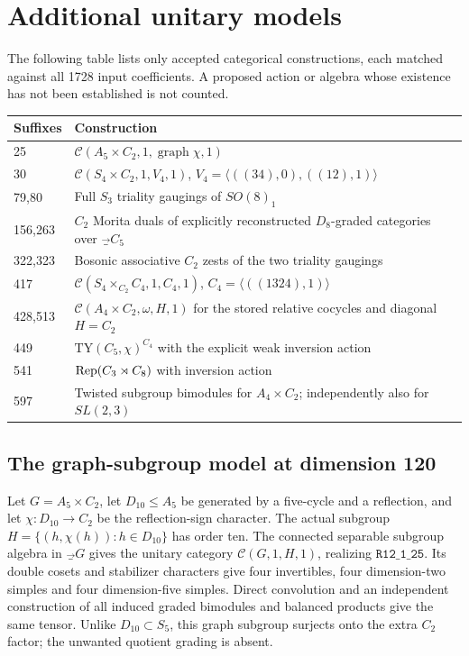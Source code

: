 \documentclass[11pt]{article}
\newcommand{\ring}[1]{\texttt{R12\_1\_#1}}
\begin{document}
\section{Additional unitary models}
The following table lists only accepted categorical constructions, each matched
against all 1728 input coefficients. A proposed action or algebra whose existence
has not been established is not counted.
\begin{center}\small\begin{longtable}{@{}lp{119mm}@{}}\toprule Suffixes&Construction\\\midrule\endhead
25&$\mathcal C(A_5\times C_2,1,\operatorname{graph}\chi,1)$\\
30&$\mathcal C(S_4\times C_2,1,V_4,1)$, $V_4=\langle((34),0),((12),1)\rangle$\\
79,80&Full $S_3$ triality gaugings of $SO(8)_1$\\
156,263&$C_2$ Morita duals of explicitly reconstructed $D_8$-graded categories over $\Vec_{C_5}$\\
322,323&Bosonic associative $C_2$ zests of the two triality gaugings\\
417&$\mathcal C(S_4\times_{C_2}C_4,1,C_4,1)$, $C_4=\langle((1324),1)\rangle$\\
428,513&$\mathcal C(A_4\times C_2,\omega,H,1)$ for the stored relative cocycles and diagonal $H=C_2$\\
449&$\mathrm{TY}(C_5,\chi)^{C_4}$ with the explicit weak inversion action\\
541&$\operatorname{Rep}(C_3\rtimes C_8)$ with inversion action\\
597&Twisted subgroup bimodules for $A_4\times C_2$; independently also for $SL(2,3)$\\\bottomrule\end{longtable}\end{center}

\subsection*{The graph-subgroup model at dimension 120}
Let $G=A_5\times C_2$, let $D_{10}\leq A_5$ be generated by a five-cycle and a
reflection, and let $\chi:D_{10}\to C_2$ be the reflection-sign character. The
actual subgroup $H=\{(h,\chi(h)):h\in D_{10}\}$ has order ten. The connected
separable subgroup algebra in $\Vec_G$ gives the unitary category
$\mathcal C(G,1,H,1)$, realizing $\ring{25}$.
Its double cosets and stabilizer characters give four invertibles, four
dimension-two simples and four dimension-five simples. Direct convolution and
an independent construction of all induced graded bimodules and balanced products
give the same tensor. Unlike $D_{10}\subset S_5$, this graph subgroup surjects
onto the extra $C_2$ factor; the unwanted quotient grading is absent.
\end{document}
